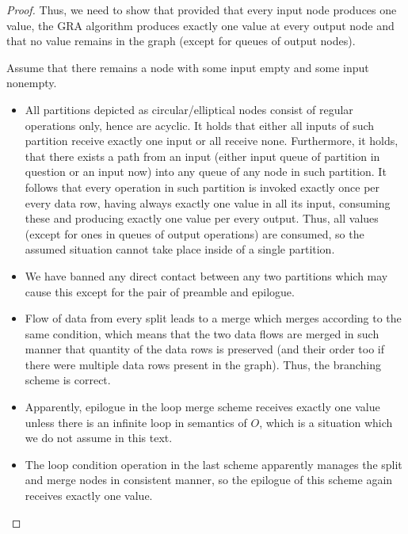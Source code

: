   \begin{proof} 
    Thus, we need to show that provided that every input node produces one value, the GRA algorithm produces exactly one value at every output node and that no value remains in the graph (except for queues of output nodes).

        Assume that there remains a node with some input empty and some input nonempty. 
        \begin{itemize}
          \item All partitions depicted as circular/elliptical nodes consist of regular operations only, hence are acyclic. It holds that either all inputs of such partition receive exactly one input or all receive none. Furthermore, it holds, that there exists a path from an input (either input queue of partition in question or an input now) into any queue of any node in such partition. It follows that every operation in such partition is invoked exactly once per every data row, having always exactly one value in all its input, consuming these and producing exactly one value per every output. Thus, all values (except for ones in queues of output operations) are consumed, so the assumed situation cannot take place inside of a single partition.  
          \item We have banned any direct contact between any two partitions which may cause this except for the pair of preamble and epilogue.
          \item Flow of data from every split leads to a merge which merges according to the same condition, which means that the two data flows are merged in such manner that quantity of the data rows is preserved (and their order too if there were multiple data rows present in the graph). Thus, the branching scheme is correct.
          \item Apparently, epilogue in the loop merge scheme receives exactly one value unless there is an infinite loop in semantics of $O$, which is a situation which we do not assume in this text.
          \item The loop condition operation in the last scheme apparently manages the split and merge nodes in consistent manner, so the epilogue of this scheme again receives exactly one value.
        \end{itemize}

  \end{proof}
\myendobs

